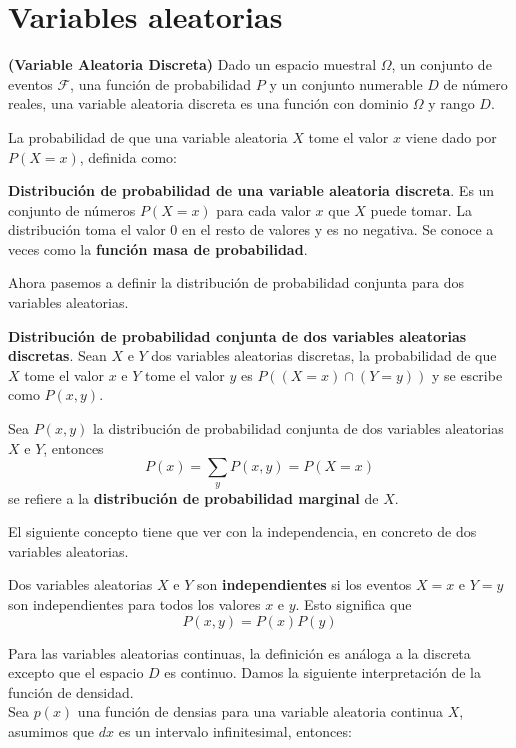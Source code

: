 \section{Variables aleatorias}
\begin{definicion}
\textbf{(Variable Aleatoria Discreta) } Dado un espacio muestral $\Omega$, un conjunto de eventos $\mathcal{F}$, una función de probabilidad $P$ y un conjunto numerable $D$ de número reales, una variable aleatoria discreta es una función con dominio $\Omega$ y rango $D$.
\end{definicion}
La probabilidad de que una variable aleatoria $X$ tome el valor $x$ viene dado por $P(X=x)$, definida como:
\begin{definicion}
\textbf{Distribución de probabilidad de una variable aleatoria discreta}. Es un conjunto de números $P(X=x)$ para cada valor $x$ que $X$ puede tomar. La distribución toma el valor 0 en el resto de valores y es no negativa. Se conoce a veces como la \textbf{función masa de probabilidad}.
\end{definicion}
Ahora pasemos a definir la distribución de probabilidad conjunta para dos variables aleatorias.
\begin{definicion}
\textbf{Distribución de probabilidad conjunta de dos variables aleatorias discretas}. Sean $X$ e $Y$ dos variables aleatorias discretas, la probabilidad de que $X$ tome el valor $x$ e $Y$ tome el valor $y$ es $P((X=x) \cap (Y=y))$ y se escribe como $P(x,y)$.
\end{definicion}
\begin{definicion}
Sea $P(x,y)$ la distribución de probabilidad conjunta de dos variables aleatorias $X$ e $Y$, entonces 
\[ P(x)=\sum_{y}P(x,y)=P(X=x) \]
se refiere a la \textbf{distribución de probabilidad marginal} de $X$.
\end{definicion}
El siguiente concepto tiene que ver con la independencia, en concreto de dos variables aleatorias.
\begin{definicion}
Dos variables aleatorias $X$ e $Y$ son \textbf{independientes} si los eventos $X=x$ e $Y=y$ son independientes para todos los valores $x$ e $y$. Esto significa que 
\[ P(x,y)=P(x)P(y) \]
\end{definicion}
Para las variables aleatorias continuas, la definición es análoga a la discreta excepto que el espacio $D$ es continuo. Damos la siguiente interpretación  de la función de densidad.\\
Sea $p(x)$ una función de densias para una variable aleatoria continua $X$, asumimos que $dx$ es un intervalo infinitesimal, entonces:
